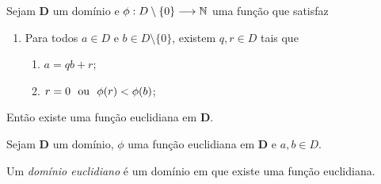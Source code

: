 \begin{prop}
Sejam $\bm D$ um domínio e $\phi: D \setminus \{0\} \longrightarrow \mathbb{N}$ uma função que satisfaz
	\begin{enumerate}
	\item Para todos $a \in D$ e $b \in D \setminus \{0\}$, existem $q,r \in D$ tais que
		\begin{enumerate}
		\item $a=qb+r$;
		\item $r=0 \text{\ \ ou\ \ } \phi(r)<\phi(b)$;
		\end{enumerate}
	\end{enumerate}
Então existe uma função euclidiana em $\bm D$.
\end{prop}
%
%
%
%
%
%
%
%

\begin{prop}
Sejam $\bm D$ um domínio, $\phi$ uma função euclidiana em $\bm D$ e $a,b \in D$.
\end{prop}

\begin{defi}
Um \emph{domínio euclidiano} é um domínio em que existe uma função euclidiana.
\end{defi}

